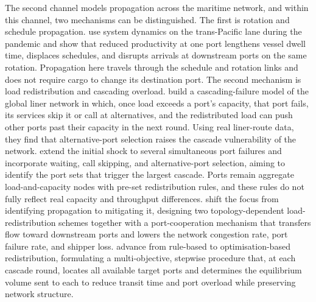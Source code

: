 \documentclass[a4paper,fleqn]{cas-sc}
\begin{document}
The second channel models propagation across the maritime network, and within this channel, two mechanisms can be distinguished. The first is rotation and schedule propagation. \citet{BellEtAl2023} use system dynamics on the trans-Pacific lane during the pandemic and show that reduced productivity at one port lengthens vessel dwell time, displaces schedules, and disrupts arrivals at downstream ports on the same rotation. Propagation here travels through the schedule and rotation links and does not require cargo to change its destination port. The second mechanism is load redistribution and cascading overload. \citet{XuEtAl2022} build a cascading-failure model of the global liner network in which, once load exceeds a port's capacity, that port fails, its services skip it or call at alternatives, and the redistributed load can push other ports past their capacity in the next round. Using real liner-route data, they find that alternative-port selection raises the cascade vulnerability of the network. \citet{XuEtAl2025} extend the initial shock to several simultaneous port failures and incorporate waiting, call skipping, and alternative-port selection, aiming to identify the port sets that trigger the largest cascade. Ports remain aggregate load-and-capacity nodes with pre-set redistribution rules, and these rules do not fully reflect real capacity and throughput differences. \citet{LuEtAl2024} shift the focus from identifying propagation to mitigating it, designing two topology-dependent load-redistribution schemes together with a port-cooperation mechanism that transfers flow toward downstream ports and lowers the network congestion rate, port failure rate, and shipper loss. \citet{CaoEtAl2025} advance from rule-based to optimisation-based redistribution, formulating a multi-objective, stepwise procedure that, at each cascade round, locates all available target ports and determines the equilibrium volume sent to each to reduce transit time and port overload while preserving network structure.
\end{document}
